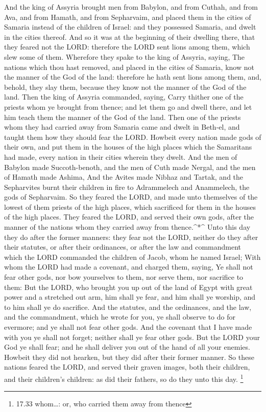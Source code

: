  And the king of Assyria brought men from Babylon, and from
Cuthah, and from Ava, and from Hamath, and from Sepharvaim, and placed
them in the cities of Samaria instead of the children of Israel: and
they possessed Samaria, and dwelt in the cities thereof. 
And so it was at the beginning of their dwelling there, that they feared
not the LORD: therefore the LORD sent lions among them, which slew some
of them.  Wherefore they spake to the king of Assyria,
saying, The nations which thou hast removed, and placed in the cities of
Samaria, know not the manner of the God of the land: therefore he hath
sent lions among them, and, behold, they slay them, because they know
not the manner of the God of the land.  Then the king of
Assyria commanded, saying, Carry thither one of the priests whom ye
brought from thence; and let them go and dwell there, and let him teach
them the manner of the God of the land.  Then one of the
priests whom they had carried away from Samaria came and dwelt in
Beth-el, and taught them how they should fear the LORD. 
Howbeit every nation made gods of their own, and put them in the houses
of the high places which the Samaritans had made, every nation in their
cities wherein they dwelt.  And the men of Babylon made
Succoth-benoth, and the men of Cuth made Nergal, and the men of Hamath
made Ashima,  And the Avites made Nibhaz and Tartak, and
the Sepharvites burnt their children in fire to Adrammelech and
Anammelech, the gods of Sepharvaim.  So they feared the
LORD, and made unto themselves of the lowest of them priests of the high
places, which sacrificed for them in the houses of the high places.
 They feared the LORD, and served their own gods, after the
manner of the nations whom they carried away from thence.\^{}*\^{}
 Unto this day they do after the former manners: they fear
not the LORD, neither do they after their statutes, or after their
ordinances, or after the law and commandment which the LORD commanded
the children of Jacob, whom he named Israel;  With whom the
LORD had made a covenant, and charged them, saying, Ye shall not fear
other gods, nor bow yourselves to them, nor serve them, nor sacrifice to
them:  But the LORD, who brought you up out of the land of
Egypt with great power and a stretched out arm, him shall ye fear, and
him shall ye worship, and to him shall ye do sacrifice. 
And the statutes, and the ordinances, and the law, and the commandment,
which he wrote for you, ye shall observe to do for evermore; and ye
shall not fear other gods.  And the covenant that I have
made with you ye shall not forget; neither shall ye fear other gods.
 But the LORD your God ye shall fear; and he shall deliver
you out of the hand of all your enemies.  Howbeit they did
not hearken, but they did after their former manner.  So
these nations feared the LORD, and served their graven images, both
their children, and their children's children: as did their fathers, so
do they unto this day. \footnote{17.33 whom\ldots: or, who carried them
  away from thence}

